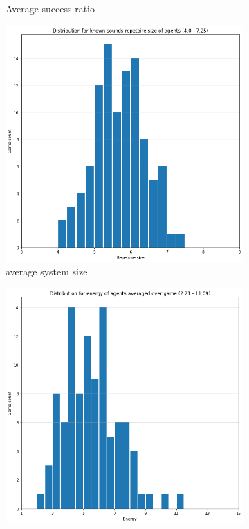 \begin{figure}[ht]
\begin{subfigure}{.30\textwidth}
        \captionsetup{width=0.9\linewidth}
        \captionsetup{justification=centering}
        \caption{Average success ratio}
    \end{subfigure}
    \hspace{0.5cm}
    \begin{subfigure}{.30\textwidth}
        \centering
        \includegraphics[width=\textwidth]{images/results/high_size.png}
        \captionsetup{width=0.9\linewidth}
        \captionsetup{justification=centering}
        \caption{average system size}
    \end{subfigure}
    \hspace{0.5cm}
    \begin{subfigure}{.30\textwidth}
        \centering
        \includegraphics[width=\textwidth]{images/results/high_energy.png}

\end{subfigure}
\end{figure}
